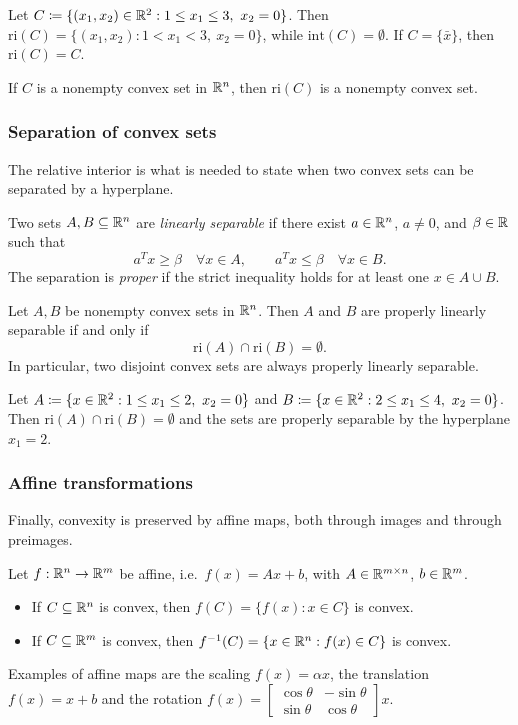\begin{example}
Let $C \coloneqq \{(x_1, x_2) \in \mathbb{R}^2 : 1 \le x_1 \le 3,\ x_2 = 0\}$. Then $\mathrm{ri}(C) = \{(x_1, x_2) : 1 < x_1 < 3,\ x_2 = 0\}$, while $\mathrm{int}(C) = \emptyset$. If $C = \{\bar{x}\}$, then $\mathrm{ri}(C) = C$.
\end{example}

\begin{theorem}
If $C$ is a nonempty convex set in $\mathbb{R}^n$, then $\mathrm{ri}(C)$ is a nonempty convex set.
\end{theorem}

\subsubsection{Separation of convex sets}

The relative interior is what is needed to state when two convex sets can be separated by a hyperplane.

Two sets $A, B \subseteq \mathbb{R}^n$ are \emph{linearly separable} if there exist $a \in \mathbb{R}^n$, $a \ne 0$, and $\beta \in \mathbb{R}$ such that
\[
    a^Tx \ge \beta \quad \forall x \in A, \qquad a^Tx \le \beta \quad \forall x \in B.
\]
The separation is \emph{proper} if the strict inequality holds for at least one $x \in A \cup B$.

\begin{theorem}[Separation]
Let $A, B$ be nonempty convex sets in $\mathbb{R}^n$. Then $A$ and $B$ are properly linearly separable if and only if
\[
    \mathrm{ri}(A) \cap \mathrm{ri}(B) = \emptyset.
\]
In particular, two disjoint convex sets are always properly linearly separable.
\end{theorem}

\begin{example}
Let $A \coloneqq \{x \in \mathbb{R}^2 : 1 \le x_1 \le 2,\ x_2 = 0\}$ and $B \coloneqq \{x \in \mathbb{R}^2 : 2 \le x_1 \le 4,\ x_2 = 0\}$. Then $\mathrm{ri}(A) \cap \mathrm{ri}(B) = \emptyset$ and the sets are properly separable by the hyperplane $x_1 = 2$.
\end{example}

\subsubsection{Affine transformations}

Finally, convexity is preserved by affine maps, both through images and through preimages.

\begin{theorem}
Let $f: \mathbb{R}^n \to \mathbb{R}^m$ be affine, i.e.\ $f(x) = Ax + b$, with $A \in \mathbb{R}^{m \times n}$, $b \in \mathbb{R}^m$.
\begin{itemize}
    \item If $C \subseteq \mathbb{R}^n$ is convex, then $f(C) = \{f(x) : x \in C\}$ is convex.
    \item If $C \subseteq \mathbb{R}^m$ is convex, then $f^{-1}(C) = \{x \in \mathbb{R}^n : f(x) \in C\}$ is convex.
\end{itemize}
\end{theorem}

Examples of affine maps are the scaling $f(x) = \alpha x$, the translation $f(x) = x + b$ and the rotation $f(x) = \begin{bmatrix} \cos\theta & -\sin\theta\\ \sin\theta & \cos\theta\end{bmatrix} x$.
